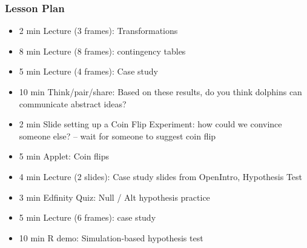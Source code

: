 \begin{frame}
    \frametitle{Lesson Plan}
    \begin{itemize}
        \item 2 min Lecture (3 frames): Transformations
        \item 8 min Lecture (8 frames): contingency tables
        
        \item 5 min Lecture (4 frames): Case study
        \item 10 min Think/pair/share: Based on these results, do you think dolphins can communicate abstract ideas?
        \item 2 min Slide setting up a Coin Flip Experiment: how could we convince someone else? -- wait for someone to suggest coin flip
        \item 5 min Applet: Coin flips
        \item 4 min Lecture (2 slides): Case study slides from OpenIntro, Hypothesis Test
        \item 3 min Edfinity Quiz: Null / Alt hypothesis practice
        \item 5 min Lecture (6 frames): case study
        \item 10 min R demo: Simulation-based hypothesis test
        
    \end{itemize}
\end{frame}



